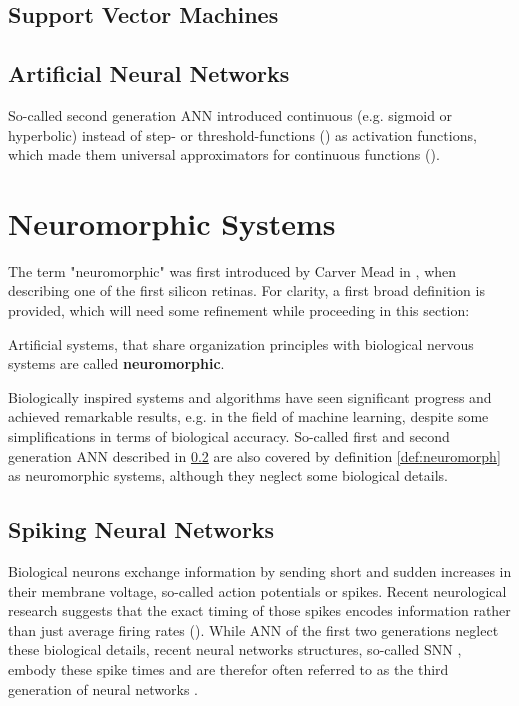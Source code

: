 \subsection{Support Vector Machines}
\subsection{Artificial Neural Networks}
\label{subsec:ML_ANN}
So-called second generation \ac{ANN} introduced continuous (e.g. sigmoid or hyperbolic) instead of step- or threshold-functions () as activation functions, which made them universal approximators for continuous functions ().
\section{Neuromorphic Systems}
The term "neuromorphic" was first introduced by Carver Mead in \cite{Mead90}, when describing one of the first silicon retinas.
For clarity, a first broad definition is provided, which will need some refinement while proceeding in this section:
\begin{defn}
\label{def:neuromorph}
Artificial systems, that share organization principles with biological nervous systems are called \textbf{neuromorphic}.
\end{defn} 
Biologically inspired systems and algorithms have seen significant progress and achieved remarkable results, e.g. in the field of machine learning, despite some simplifications in terms of biological accuracy.
So-called first and second generation \ac{ANN} described in \ref{subsec:ML_ANN} are also covered by definition \ref{def:neuromorph} as neuromorphic systems, although they neglect some biological details.
\subsection{Spiking Neural Networks}
Biological neurons exchange information by sending short and sudden increases in their membrane voltage, so-called action potentials or spikes.
Recent neurological research suggests that the exact timing of those spikes encodes information rather than just average firing rates ().
While \ac{ANN} of the first two generations neglect these biological details, recent neural networks structures, so-called \ac{SNN} \cite{Paugam2009}, embody these spike times and are therefor often referred to as the third generation of neural networks . 



